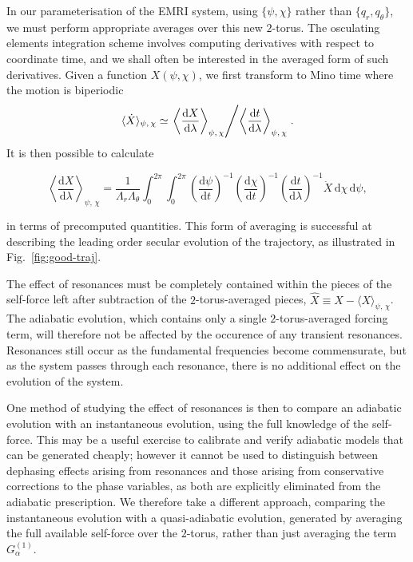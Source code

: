 \documentclass[aps,prd,amsfonts,amssymb,amsmath,nofootinbib,reprint,showpacs,superscriptaddress,twocolumn]{revtex4}
\newcommand{\figref}[1]{Fig.\ \ref{fig:#1}}
\newcommand{\dd}{\ensuremath{\mathrm{d}}}
\newcommand{\diff}[2]{\ensuremath{\dfrac{\dd {#1}}{\dd {#2}}}}
\newcommand{\intd}[4]{\ensuremath{\int_{#1}^{#2}{#3}\,\dd{#4}}}
\begin{document}
In our parameterisation of the EMRI system, using $\{\psi,\chi\}$ rather than $\{q_r,q_\theta\}$, we must perform appropriate averages over this new $2$-torus. The osculating elements integration scheme involves computing derivatives with respect to coordinate time, and we shall often be interested in the averaged form of such derivatives. Given a function $X(\psi,\chi)$, we first transform to Mino time where the motion is biperiodic
\begin{equation}
\langle \dot{X}\rangle_{\psi,\,\chi} \simeq \left.\left\langle \diff{X}{\lambda}\right\rangle_{\psi,\,\chi}\middle/\left\langle \diff{t}{\lambda}\right\rangle_{\psi,\,\chi}\right..
\end{equation}
It is then possible to calculate
\begin{widetext}\begin{equation}
\label{eq:2torus-average}
\left\langle \diff{X}{\lambda}\right\rangle_{\psi,\,\chi} = \frac1{\Lambda_r\Lambda_\theta} \intd{0}{2\pi}{ \intd{0}{2\pi}{ \left(\diff{\psi}{t}\right)^{-1} \left(\diff{\chi}{t}\right)^{-1} \left(\diff{t}{\lambda}\right)^{-1} \dot{X} }{\chi} }{\psi},
\end{equation}\end{widetext}
in terms of precomputed quantities. This form of averaging is successful at describing the leading order secular evolution of the trajectory, as illustrated in \figref{good-traj}.

The effect of resonances must be completely contained within the pieces of the self-force left after subtraction of the $2$-torus-averaged pieces, $\hat{X}\equiv X-\langle X\rangle_{\psi,\,\chi}$. The adiabatic evolution, which contains only a single $2$-torus-averaged forcing term, will therefore not be affected by the occurence of any transient resonances. Resonances still occur as the fundamental frequencies become commensurate, but as the system passes through each resonance, there is no additional effect on the evolution of the system.

One method of studying the effect of resonances is then to compare an adiabatic evolution with an instantaneous evolution, using the full knowledge of the self-force. This may be a useful exercise to calibrate and verify adiabatic models that can be generated cheaply; however it cannot be used to distinguish between dephasing effects arising from resonances and those arising from conservative corrections to the phase variables, as both are explicitly eliminated from the adiabatic prescription. We therefore take a different approach, comparing the instantaneous evolution with a quasi-adiabatic evolution, generated by averaging the full available self-force over the $2$-torus, rather than just averaging the term $G_\alpha^{(1)}$.
\end{document}
